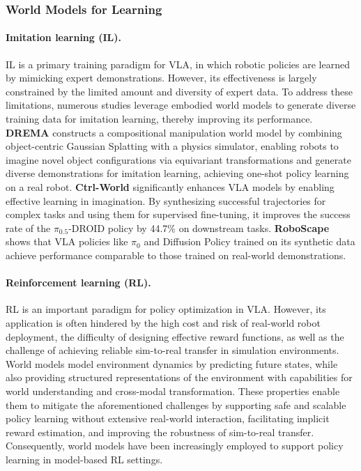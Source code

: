 \subsubsection{World Models for Learning}

\paragraph{Imitation learning (IL).} IL is a primary training paradigm for VLA, in which robotic policies are learned by mimicking expert demonstrations. However, its effectiveness is largely constrained by the limited amount and diversity of expert data. To address these limitations, numerous studies leverage embodied world models to generate diverse training data for imitation learning, thereby improving its performance. \textbf{DREMA} \cite{DREMA} constructs a compositional manipulation world model by combining object-centric Gaussian Splatting with a physics simulator, enabling robots to imagine novel object configurations via equivariant transformations and generate diverse demonstrations for imitation learning, achieving one-shot policy learning on a real robot. \textbf{Ctrl-World} \cite{Ctrl-World} significantly enhances VLA models by enabling effective learning in imagination. By synthesizing successful trajectories for complex tasks and using them for supervised fine-tuning, it improves the success rate of the $\pi_{0.5}$-DROID \cite{pi05} policy by 44.7\% on downstream tasks. \textbf{RoboScape} \cite{RoboScape} shows that VLA policies like $\pi_0$ \cite{pi0} and Diffusion Policy \cite{Diffusion_Policy} trained on its synthetic data achieve performance comparable to those trained on real-world demonstrations.

\paragraph{Reinforcement learning (RL).} RL is an important paradigm for policy optimization in VLA. However, its application is often hindered by the high cost and risk of real-world robot deployment, the difficulty of designing effective reward functions, as well as the challenge of achieving reliable sim-to-real transfer in simulation environments. World models model environment dynamics by predicting future states, while also providing structured representations of the environment with capabilities for world understanding and cross-modal transformation. These properties enable them to mitigate the aforementioned challenges by supporting safe and scalable policy learning without extensive real-world interaction, facilitating implicit reward estimation, and improving the robustness of sim-to-real transfer. Consequently, world models have been increasingly employed to support policy learning in model-based RL settings.

